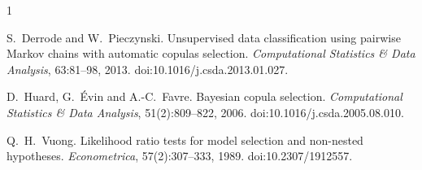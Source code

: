 \documentclass[11pt,a4paper]{article}
\begin{document}
\begin{thebibliography}{1}

S.~Derrode and W.~Pieczynski.
\newblock Unsupervised data classification using pairwise {M}arkov chains
  with automatic copulas selection.
\newblock \emph{Computational Statistics \& Data Analysis}, 63:81--98, 2013.
\newblock doi:10.1016/j.csda.2013.01.027.

D.~Huard, G.~\'Evin and A.-C.~Favre.
\newblock Bayesian copula selection.
\newblock \emph{Computational Statistics \& Data Analysis}, 51(2):809--822,
  2006.
\newblock doi:10.1016/j.csda.2005.08.010.

Q.~H.~Vuong.
\newblock Likelihood ratio tests for model selection and non-nested
  hypotheses.
\newblock \emph{Econometrica}, 57(2):307--333, 1989.
\newblock doi:10.2307/1912557.

\end{thebibliography}
\end{document}

